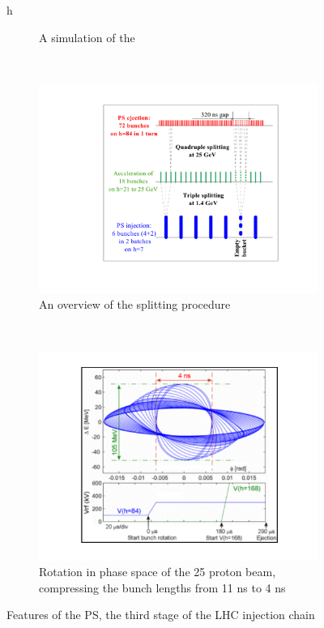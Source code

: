 \begin{figure}{h}
\begin{subfigure}[h]{0.45\textwidth}
        \caption{A simulation of the }\label{fig:ps_split2x2}
      \end{subfigure}
       ~ %
      \begin{subfigure}[h]{0.45\textwidth}
        \includegraphics[width=\textwidth]{Figures/LHC_Diagrams/LHC__PS__BunchSplittingDiagram.pdf}
        \caption{An overview of the splitting procedure}\label{fig:ps_splitting}
      \end{subfigure}
      ~ %
      \begin{subfigure}[h]{0.45\textwidth}
        \includegraphics[width=\textwidth]{Figures/LHC_Diagrams/LHC__PS__BunchCompression.pdf}
        \caption{Rotation in phase space of the 25 \GeV proton beam,
          compressing the bunch lengths from 11 ns to 4 ns}\label{fig:ps_bunch_compression}
      \end{subfigure}
      \caption{Features of the PS, the third stage of
        the LHC injection chain}\label{fig:ps}
\end{figure}


